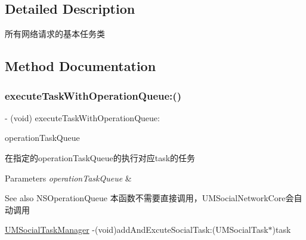 \subsection{Detailed Description}
所有网络请求的基本任务类 

\subsection{Method Documentation}
\mbox{\label{interface_u_m_social_task_a79e5336ee23aa654eb48defea5450245}} 
\subsubsection{\texorpdfstring{execute\+Task\+With\+Operation\+Queue\+:()}{executeTaskWithOperationQueue:()}\hspace{0.1cm}{\footnotesize\ttfamily [1/2]}}
{\footnotesize\ttfamily -\/ (void) execute\+Task\+With\+Operation\+Queue\+: \begin{DoxyParamCaption}\item[{(N\+S\+Operation\+Queue $\ast$)}]{operation\+Task\+Queue }\end{DoxyParamCaption}}

在指定的operation\+Task\+Queue的执行对应task的任务


\begin{DoxyParams}{Parameters}
{\em operation\+Task\+Queue} & \\
\hline
\end{DoxyParams}
\begin{DoxySeeAlso}{See also}
N\+S\+Operation\+Queue  本函数不需要直接调用，\+U\+M\+Social\+Network\+Core会自动调用 

\mbox{\hyperlink{interface_u_m_social_task_manager}{U\+M\+Social\+Task\+Manager}} -\/(void)add\+And\+Excute\+Social\+Task\+:(\+U\+M\+Social\+Task$\ast$)task 
\end{DoxySeeAlso}
\mbox{\label{interface_u_m_social_task_a79e5336ee23aa654eb48defea5450245}} 
